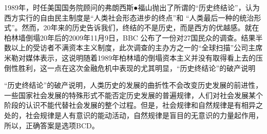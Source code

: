 \question 1989年，时任美国国务院顾问的弗朗西斯●福山抛出了所谓的``历史终结论''，认为西方实行的自由民主制度是``人类社会形态进步的终点''和
``人类最后一种的统治形式''。然而，20年来的历史告诉我们，终结的不是历史，而是西方的优越感。就在柏林墙倒塌20年后的2009年11月9日，BBC
公布了一份对27国民众的调查。结果半数以上的受访者不满资本主义制度，此次调查的主办方之一的``全球扫描''公司主席米勒对媒体表示，这说明随着1989年柏林墙的倒塌资本主义并没有取得看上去的压倒性胜利，这一点在这次金融危机中表现的尤其明显，``历史终结论''的破产说明
\par{}
\begin{solution}``历史终结论''的破产说明，人类历史的发展的曲折性不会改变历史发展的前进性，一些国家社会发展的特殊形式不能否定历史发展的普遍规律，人们对社会发展某个阶段的认识不能代替社会发展的整个过程。但是，社会规律和自然规律是有相异之处的，社会规律是人有意识的能动活动，自然规律是盲目的无意识的力量起作用，所以，正确答案是选项BCD。
\end{solution}
